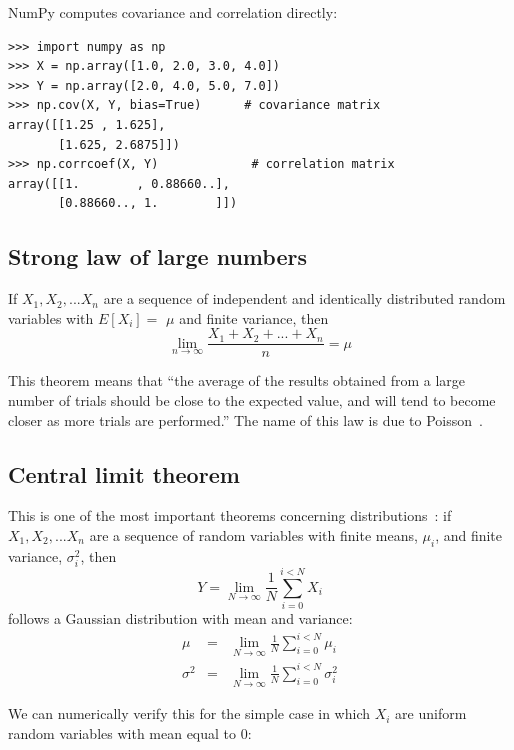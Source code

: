 \documentclass[justified, sixbynine]{tufte-book}
\theoremstyle{plain}%
\newtheorem * {corollary}{Corollary}
\theoremstyle{definition}
\theoremstyle{remark}
\newtheorem * {remark}{Remark}
\newtheorem * {note}{Note}
\begin{document}
\begin{fullwidth}
NumPy computes covariance and correlation directly:

\begin{lstlisting}
>>> import numpy as np
>>> X = np.array([1.0, 2.0, 3.0, 4.0])
>>> Y = np.array([2.0, 4.0, 5.0, 7.0])
>>> np.cov(X, Y, bias=True)      # covariance matrix
array([[1.25 , 1.625],
       [1.625, 2.6875]])
>>> np.corrcoef(X, Y)             # correlation matrix
array([[1.        , 0.88660..],
       [0.88660.., 1.        ]])
\end{lstlisting}

\goodbreak\subsection{Strong law of large numbers}

If $X_1, X_2, ...X_n$ are a sequence of independent and identically
distributed random variables with $E[X_i]=$ $\mu $ and finite variance, then
\begin{equation}
\lim_{n\rightarrow \infty }\frac{X_1+X_2+...+X_n}n=\mu
\end{equation}

This theorem means that ``the average of the results obtained from a large number of trials should be close to the expected value, and will tend to become closer as more trials are performed.'' The name of this law is due to Poisson~\cite{largenumbers}.

\goodbreak\subsection{Central limit theorem}

This is one of the most important theorems concerning distributions~\cite{central}:
if $X_1, X_2, ...X_n$ are a sequence of random variables with finite means, $\mu_i$, and finite variance, $\sigma^2_i$, then
\begin{equation}
Y = \lim_{N\rightarrow\infty}\frac1N \sum_{i=0}^{i<N} X_i
\end{equation}
follows a Gaussian distribution with mean and variance:
\begin{eqnarray}
\mu &=& \lim_{N\rightarrow\infty}\frac1N \sum_{i=0}^{i<N} \mu_i \\
\sigma^2 &=& \lim_{N\rightarrow\infty}\frac1N \sum_{i=0}^{i<N} \sigma^2_i
\end{eqnarray}

We can numerically verify this for the simple case in which $X_i$ are uniform random variables with mean equal to 0:


\end{fullwidth}
\end{document}
